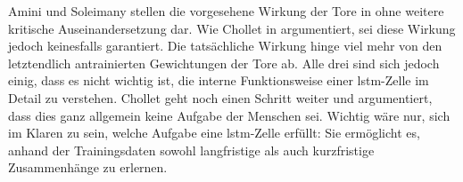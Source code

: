 Amini und Soleimany stellen die vorgesehene Wirkung der Tore in \cite{6S191RNN} ohne weitere kritische Auseinandersetzung dar.
Wie Chollet in \cite[S. 263]{DeepLearningPythonKeras} argumentiert, sei diese Wirkung jedoch keinesfalls garantiert.
Die tatsächliche Wirkung hinge viel mehr von den letztendlich antrainierten Gewichtungen der Tore ab.
Alle drei sind sich jedoch einig, dass es nicht wichtig ist, die interne Funktionsweise einer \acrshort{lstm}-Zelle im Detail zu verstehen.
Chollet geht noch einen Schritt weiter und argumentiert, dass dies ganz allgemein keine Aufgabe der Menschen sei.
Wichtig wäre nur, sich im Klaren zu sein, welche Aufgabe eine \acrshort{lstm}-Zelle erfüllt: Sie ermöglicht es, anhand der Trainingsdaten sowohl langfristige als auch kurzfristige Zusammenhänge zu erlernen.
